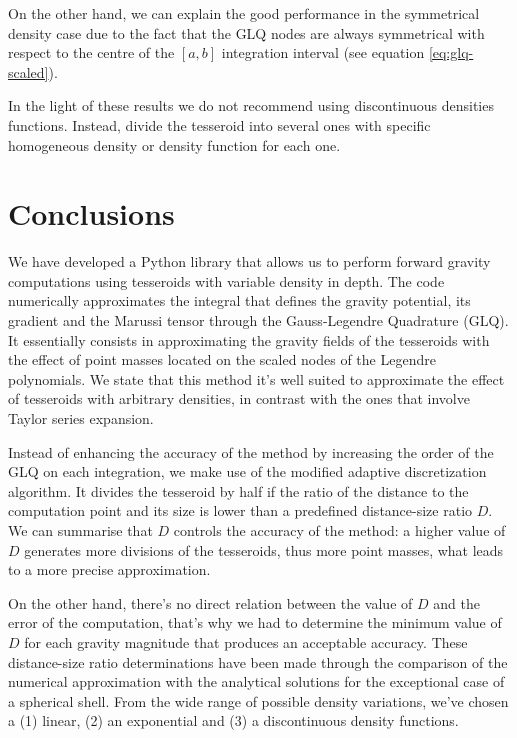 \documentclass[extra]{gji}
\begin{document}
On the other hand, we can explain the good performance in the symmetrical density case due to the fact that the GLQ nodes are always symmetrical with respect to the centre of the $[a,b]$ integration interval (see equation \ref{eq:glq-scaled}).

In the light of these results we do not recommend using discontinuous densities functions. Instead, divide the tesseroid into several ones with specific homogeneous density or density function for each one.


\section{Conclusions}

We have developed a Python library that allows us to perform forward gravity computations using tesseroids with variable density in depth.
The code numerically approximates the integral that defines the gravity potential, its gradient and the Marussi tensor through the Gauss-Legendre Quadrature (GLQ).
It essentially consists in approximating the gravity fields of the tesseroids with the effect of point masses located on the scaled nodes of the Legendre polynomials.
We state that this method it's well suited to approximate the effect of tesseroids with arbitrary densities, in contrast with the ones that involve Taylor series expansion.

Instead of enhancing the accuracy of the method by increasing the order of the GLQ on each integration, we make use of the modified adaptive discretization algorithm.
It divides the tesseroid by half if the ratio of the distance to the computation point and its size is lower than a predefined distance-size ratio $D$.
We can summarise that $D$ controls the accuracy of the method: a higher value of $D$ generates more divisions of the tesseroids, thus more point masses, what leads to a more precise approximation.

On the other hand, there's no direct relation between the value of $D$ and the error of the computation, that's why we had to determine the minimum value of $D$ for each gravity magnitude that produces an acceptable accuracy.
These distance-size ratio determinations have been made through the comparison of the numerical approximation with the analytical solutions for the exceptional case of a spherical shell.
From the wide range of possible density variations, we've chosen a (1) linear, (2) an exponential and (3) a discontinuous density functions.
\end{document}
